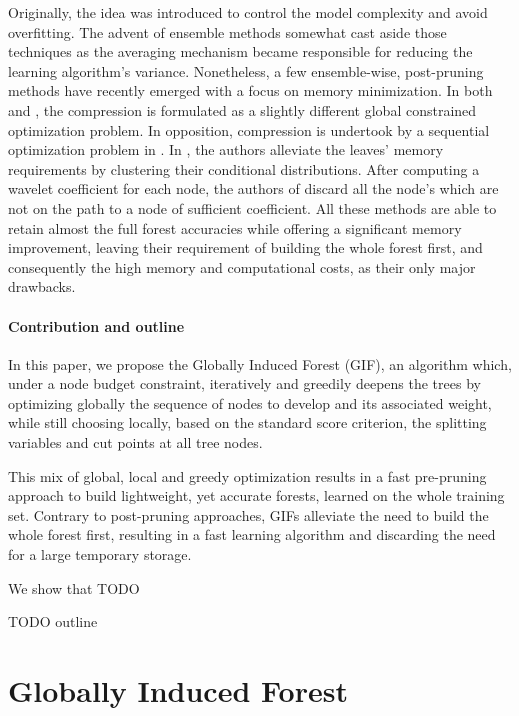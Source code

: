 \documentclass{article}
\begin{document}
Originally, the idea was introduced to control the model complexity and avoid 
overfitting. The advent of ensemble methods somewhat cast aside those 
techniques as the averaging mechanism became responsible for reducing the 
learning algorithm's variance. Nonetheless, a few ensemble-wise, post-pruning 
methods have recently emerged with a focus on memory minimization. In both 
\citet{meinshausen2009forestgarrote} and \citet{l1basedcomp}, the compression 
is formulated as a slightly different global constrained optimization problem. 
In opposition, compression is undertook by a sequential optimization problem in 
\citet{ren2015glorefinement}.
In \citet{vleeschouwer2015mitimemreq}, the authors alleviate the leaves’ memory 
requirements by clustering their conditional distributions. After computing a 
wavelet coefficient for each node, the authors of \citet{elisha2016wavelet} 
discard all the node's which are not on the path to a node of sufficient 
coefficient.
All these methods are able to retain almost the full forest accuracies while 
offering a significant memory improvement, leaving their requirement of 
building the whole forest first, and consequently the high memory and 
computational costs, as their only major drawbacks.


\paragraph{Contribution and outline}
In this paper, we propose the Globally Induced Forest (GIF), an algorithm 
which, under a node budget constraint, iteratively and greedily deepens the 
trees by optimizing globally the sequence of nodes to develop and its 
associated weight, while still choosing locally, based on the standard score 
criterion, the splitting variables and cut points at all tree nodes. 

This mix of global, local and greedy optimization results in a fast pre-pruning 
approach to build lightweight, yet accurate forests, learned on the whole 
training set. Contrary to post-pruning approaches, GIFs alleviate the need to 
build the whole forest first, resulting in a fast learning algorithm and 
discarding the need for a large temporary storage.

We show that TODO

TODO outline


\section{Globally Induced Forest}
\label{sec:gif}
\end{document}
